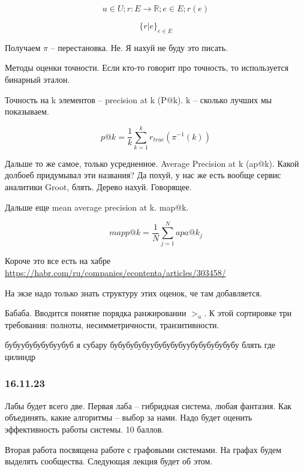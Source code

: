 \begin{equation}
    u \in U; r: E \rightarrow \mathbb{R}; e \in E; r(e)
\end{equation}

\begin{equation}
    \{r|e\}_{e \in E}
\end{equation}

Получаем $\pi$ -- перестановка. Не. Я нахуй не буду это писать.

Методы оценки точности. Если кто-то говорит про точность, то используется бинарный эталон.

Точность на k элементов -- precision at k (P@k). k -- сколько лучших мы показываем.

\begin{equation}
    p@k = \frac{1}{k} \sum_{k = 1}^{k}{r_{true}(\pi^{-1}(k))}
\end{equation}

Дальше то же самое, только усредненное. Average Precision at k (ap@k). Какой долбоеб придумывал эти названия? Да похуй, у нас же есть вообще сервис аналитики Groot, блять. Дерево нахуй. Говорящее.

Дальше еще mean average precision at k. map@k. 

\begin{equation}
    mapp@k = \frac{1}{N} \sum_{j = 1}^{N}{apa@k_j}
\end{equation}

Короче это все есть на хабре \url{https://habr.com/ru/companies/econtenta/articles/303458/}

На экзе надо только знать структуру этих оценок, че там добавляется.


Бабаба. Вводится понятие порядка ранжировании $>_u$. К этой сортировке три требования: полноты, несимметричности, транзитивности.


бубуубубубубуубуб я субару бубубубубуубубубубуубубубубубубу блять где цилиндр


\subsubsection{16.11.23}
Лабы будет всего две. Первая лаба -- гибридная система, любая фантазия. Как объединять, какие алгоритмы -- выбор за нами. Надо будет оценить эффективность работы системы. 10 баллов.

Вторая работа посвящена работе с графовыми системами. На графах будем выделять сообщества. Следующая лекция будет об этом.

